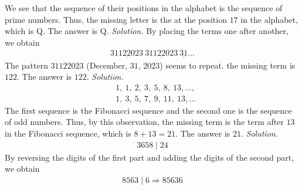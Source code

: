 \begin{multicols}{2}
\begin{table}[H]
		\vspace*{-10pt}
		\end{table}
		We see that the sequence of their positions in the alphabet is the sequence of prime numbers.
		Thus, the missing letter is the  at the position $17$ in the alphabet, which is Q. The answer is Q.
	\vskip 0.05cm
	\vskip 0.05cm
	\textit{Solution.} By placing the terms one after another, we obtain
	\begin{align*}
		\underline{31122023}\ \underline{31122023}\ \underline{31}\ldots
	\end{align*}
	The pattern $31122023$ (December, $31$, $2023$) seems to repeat. 
	 the missing term is $122$. The answer is $122$.
	\vskip 0.05cm
	\vskip 0.05cm
	\textit{Solution.} 
	\begin{align*}
		&1,\ 1,\ 2,\ 3,\ 5,\ 8,\ 13, \ldots,\\
		&1,\ 3,\ 5,\ 7,\ 9,\ 11,\ 13, \ldots
	\end{align*}
	The first sequence is the Fibonacci sequence and the second one is the sequence of odd numbers.
	Thus, by this observation, the missing term is the term after $13$ in the Fibonacci sequence, which is $8+13=21$.
	The answer is $21$.
	\vskip 0.05cm
	\vskip 0.05cm
	\textit{Solution.} 
	\begin{align*}
		3658 \mid 24
	\end{align*}
	By reversing the digits of the first part and adding the digits of the second part, we obtain
	\begin{align*}
		8563 \mid 6 \Longrightarrow 85636
	\end{align*}	

\end{multicols}
